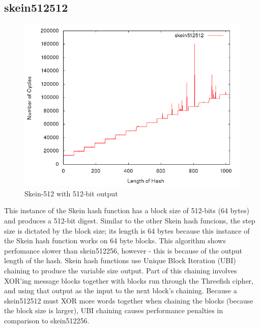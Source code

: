 \documentclass[10pt,a4paper]{article}
\begin{document}
\subsection{skein512512}

    \begin{figure}[H]
        \begin{center}
            \includegraphics[scale=0.5]{images/skein512512.png} 
            \caption{Skein-512 with 512-bit output}
        \end{center}
    \end{figure}

This instance of the Skein hash function has a block size of 512-bits (64 bytes) and produces a 512-bit digest.  Similar to the other Skein hash funcions, the step size is dictated by the block size; its length is 64 bytes because this instance of the Skein hash function works on 64 byte blocks.  This algorithm shows perfomance slower than skein512256, however - this is because of the output length of the hash.  Skein hash functions use Unique Block Iteration (UBI) chaining to produce the variable size output.  Part of this chaining involves XOR'ing message blocks together with blocks run through the Threefish cipher, and using that output as the input to the next block's chaining.  Because a skein512512 must XOR more words together when chaining the blocks (because the block size is larger), UBI chaining causes performance penalties in comparison to skein512256.
\end{document}
